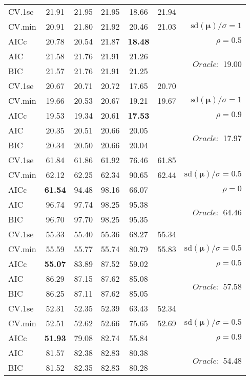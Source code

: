 \begin{table}
\begin{center}
\begin{tabular}{l*{5}{c}|r}
 \hline 
CV.1se & 21.91 & 21.95 & 21.95 & 18.66 & 21.94 & \\
CV.min & 20.91 & 21.80 & 21.92 & 20.46 & 21.03 &  $\mathrm{sd}(\mathbf{\mu})/\sigma=1$ \\
AICc & 20.78 & 20.54 & 21.87 & {\bf 18.48} & & $\rho=0.5$ \\
AIC & 21.58 & 21.76 & 21.91 & 21.26 & &  \multirow{2}{*}{$Oracle: $ 19.00} \\
BIC & 21.57 & 21.76 & 21.91 & 21.25 & &  \\
 \hline 
CV.1se & 20.67 & 20.71 & 20.72 & 17.65 & 20.70 & \\
CV.min & 19.66 & 20.53 & 20.67 & 19.21 & 19.67 &  $\mathrm{sd}(\mathbf{\mu})/\sigma=1$ \\
AICc & 19.53 & 19.34 & 20.61 & {\bf 17.53} & & $\rho=0.9$ \\
AIC & 20.35 & 20.51 & 20.66 & 20.05 & &  \multirow{2}{*}{$Oracle: $ 17.97} \\
BIC & 20.34 & 20.50 & 20.66 & 20.04 & &  \\
 \hline 
CV.1se & 61.84 & 61.86 & 61.92 & 76.46 & 61.85 & \\
CV.min & 62.12 & 62.25 & 62.34 & 90.65 & 62.44 &  $\mathrm{sd}(\mathbf{\mu})/\sigma=0.5$ \\
AICc & {\bf 61.54} & 94.48 & 98.16 & 66.07 & & $\rho=0$ \\
AIC & 96.74 & 97.74 & 98.25 & 95.38 & &  \multirow{2}{*}{$Oracle: $ 64.46} \\
BIC & 96.70 & 97.70 & 98.25 & 95.35 & &  \\
 \hline 
CV.1se & 55.33 & 55.40 & 55.36 & 68.27 & 55.34 & \\
CV.min & 55.59 & 55.77 & 55.74 & 80.79 & 55.83 &  $\mathrm{sd}(\mathbf{\mu})/\sigma=0.5$ \\
AICc & {\bf 55.07} & 83.89 & 87.52 & 59.02 & & $\rho=0.5$ \\
AIC & 86.29 & 87.15 & 87.62 & 85.08 & &  \multirow{2}{*}{$Oracle: $ 57.58} \\
BIC & 86.25 & 87.11 & 87.62 & 85.05 & &  \\
 \hline 
CV.1se & 52.31 & 52.35 & 52.39 & 63.43 & 52.34 & \\
CV.min & 52.51 & 52.62 & 52.66 & 75.65 & 52.69 &  $\mathrm{sd}(\mathbf{\mu})/\sigma=0.5$ \\
AICc & {\bf 51.93} & 79.08 & 82.74 & 55.84 & & $\rho=0.9$ \\
AIC & 81.57 & 82.38 & 82.83 & 80.38 & &  \multirow{2}{*}{$Oracle: $ 54.48} \\
BIC & 81.52 & 82.35 & 82.83 & 80.28 & &  \\
 \hline 
\end{tabular}
\end{center}
\vspace{-1cm}
\end{table}




